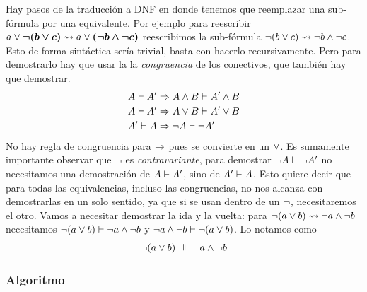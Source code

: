Hay pasos de la traducción a DNF en donde tenemos que reemplazar una sub-fórmula por una equivalente.  Por ejemplo para reescribir
\(
    a \vee \bm{\neg (b \vee c)}
    \rightsquigarrow
    a \vee \bm{(\neg b \wedge \neg c)}
\)
reescribimos la sub-fórmula $\neg
(b \vee
c) \rightsquigarrow \neg b \wedge \neg c$.
Esto de forma sintáctica sería trivial, basta con hacerlo recursivamente. Pero para demostrarlo hay que usar la la
\textit{congruencia} de los conectivos, que también hay que demostrar.
\begin{align*}
    A \vdash A'
        &\Rightarrow A \wedge B \vdash A' \wedge B\\
    A \vdash A'
        &\Rightarrow A \vee B \vdash A' \vee B\\
    A' \vdash A
        &\Rightarrow \neg A \vdash \neg A'
\end{align*}
No hay regla de congruencia para $\to$ pues se convierte en un $\vee$. Es
sumamente importante observar que $\neg$ es \textit{contravariante}, para
demostrar $\neg A \vdash \neg A'$ no necesitamos una demostración
de $A \vdash A'$, sino de $A' \vdash A$. Esto quiere decir que
para todas las equivalencias, incluso las congruencias, no nos alcanza con
demostrarlas en un solo sentido, ya que si se usan dentro de un $\neg$, necesitaremos el otro. Vamos a necesitar demostrar la
ida y la vuelta: para $\neg(a \vee b) \rightsquigarrow
\neg a \wedge \neg b$ necesitamos
\(
    \neg(a \vee b)
        \vdash \neg a \wedge \neg b
\) y \(
    \neg a \wedge \neg b \vdash \neg(a \vee b)
\). Lo notamos como \[
    \neg(a \vee b)
        \dashv\vdash \neg a \wedge \neg b
\]

\subsubsection{Algoritmo}
\label{ppa:sec:dnf:algoritmo}

